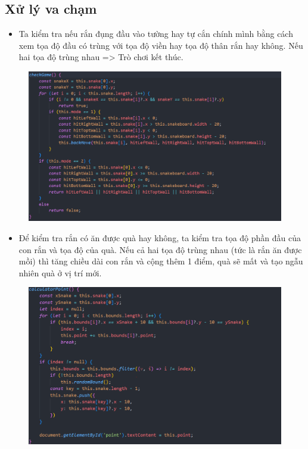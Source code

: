 \documentclass[../main-report.tex]{subfiles}
\begin{document}
\subsection{Xử lý va chạm}
\begin{itemize}
    \item Ta kiểm tra nếu rắn đụng đầu vào tường hay tự cắn chính mình bằng cách xem tọa độ đầu có trùng với tọa độ viền hay tọa độ thân rắn hay không. Nếu hai tọa độ trùng nhau => Trò chơi kết thúc.
\end{itemize}
\begin{figure}[ht]
    \centering
    \includegraphics[scale=0.4]{chapters/hinh/snake2.png}
\end{figure}
\begin{itemize}
    \item Để kiểm tra rắn có ăn được quà hay không, ta kiểm tra tọa độ phần đầu của con
rắn và tọa độ của quà. Nếu cả hai tọa độ trùng nhau (tức là rắn ăn được mồi) thì tăng chiều dài con rắn và cộng thêm 1 điểm, quà sẽ mất và tạo ngẫu nhiên quà ở vị trí mới.
\end{itemize}
\begin{figure}[ht]
    \centering
    \includegraphics[scale=0.6]{chapters/hinh/snake3.png}
\end{figure}
\end{document}
